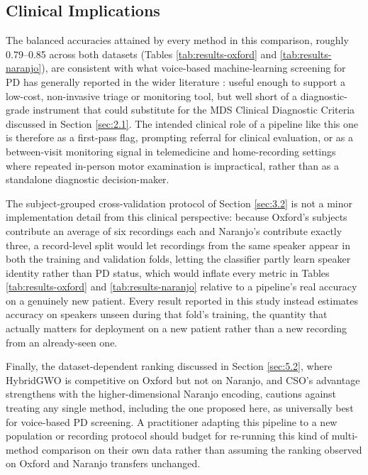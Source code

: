 \subsection{Clinical Implications} \label{sec:5.3}
The balanced accuracies attained by every method in this comparison, roughly 0.79--0.85 across both datasets (Tables \ref{tab:results-oxford} and \ref{tab:results-naranjo}), are consistent with what voice-based machine-learning screening for PD has generally reported in the wider literature \cite{SedighMalekroodi:2025}: useful enough to support a low-cost, non-invasive triage or monitoring tool, but well short of a diagnostic-grade instrument that could substitute for the MDS Clinical Diagnostic Criteria discussed in Section \ref{sec:2.1}. The intended clinical role of a pipeline like this one is therefore as a first-pass flag, prompting referral for clinical evaluation, or as a between-visit monitoring signal in telemedicine and home-recording settings where repeated in-person motor examination is impractical, rather than as a standalone diagnostic decision-maker.

The subject-grouped cross-validation protocol of Section \ref{sec:3.2} is not a minor implementation detail from this clinical perspective: because Oxford's subjects contribute an average of six recordings each and Naranjo's contribute exactly three, a record-level split would let recordings from the same speaker appear in both the training and validation folds, letting the classifier partly learn speaker identity rather than PD status, which would inflate every metric in Tables \ref{tab:results-oxford} and \ref{tab:results-naranjo} relative to a pipeline's real accuracy on a genuinely new patient. Every result reported in this study instead estimates accuracy on speakers unseen during that fold's training, the quantity that actually matters for deployment on a new patient rather than a new recording from an already-seen one.

Finally, the dataset-dependent ranking discussed in Section \ref{sec:5.2}, where HybridGWO is competitive on Oxford but not on Naranjo, and CSO's advantage strengthens with the higher-dimensional Naranjo encoding, cautions against treating any single method, including the one proposed here, as universally best for voice-based PD screening. A practitioner adapting this pipeline to a new population or recording protocol should budget for re-running this kind of multi-method comparison on their own data rather than assuming the ranking observed on Oxford and Naranjo transfers unchanged.

